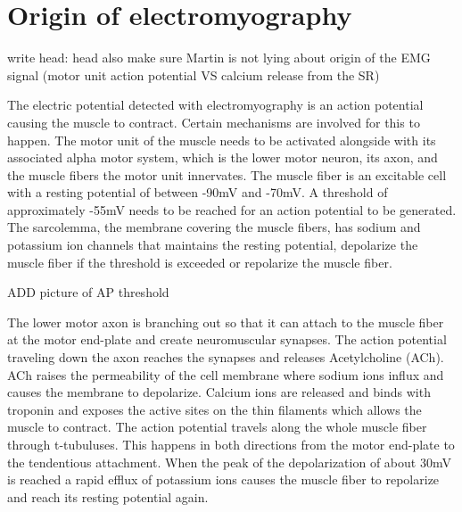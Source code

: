 \section{Origin of electromyography}

write head: head
also make sure Martin is not lying about origin of the EMG signal (motor unit action potential VS calcium release from the SR)

The electric potential detected with electromyography is an action potential causing the muscle to contract. Certain mechanisms are involved for this to happen. The motor unit of the muscle needs to be activated alongside with its associated alpha motor system, which is the lower motor neuron, its axon, and the muscle fibers the motor unit innervates. The muscle fiber is an excitable cell with a resting potential of between -90mV and -70mV. A threshold of approximately -55mV needs to be reached for an action potential to be generated. The sarcolemma, the membrane covering the muscle fibers, has sodium and potassium ion channels that maintains the resting potential, depolarize the muscle fiber if the threshold is exceeded or repolarize the muscle fiber. \cite{cram2012}

ADD picture of AP threshold


The lower motor axon is branching out so that it can attach to the muscle fiber at the motor end-plate and create neuromuscular synapses. The action potential traveling down the axon reaches the synapses and releases Acetylcholine (ACh). ACh raises the permeability of the cell membrane where sodium ions influx and causes the membrane to depolarize. Calcium ions are released and binds with troponin and exposes the active sites on the thin filaments which allows the muscle to contract. The action potential travels along the whole muscle fiber through t-tubuluses. This happens in both directions from the motor end-plate to the tendentious attachment. When the peak of the depolarization of about 30mV is reached a rapid efflux of potassium ions causes the muscle fiber to repolarize and reach its resting potential again. \cite{cram2012}

